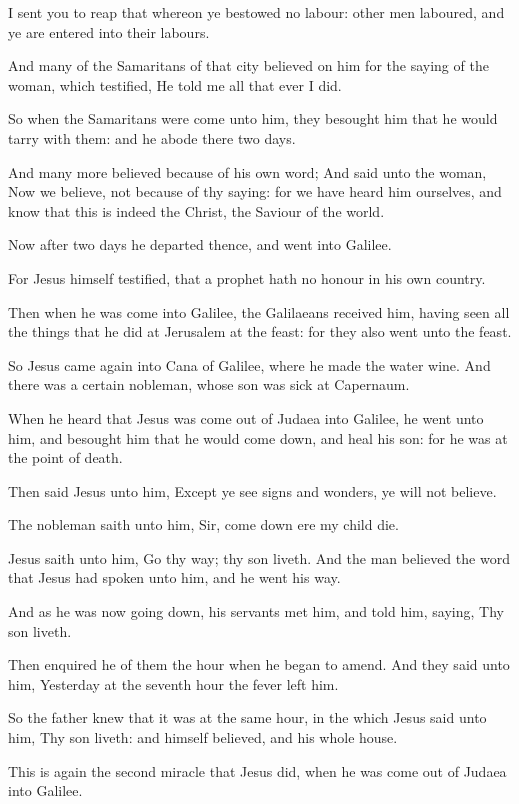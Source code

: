 \Verse I sent you to reap that whereon ye bestowed no labour: other men laboured, and ye are entered into their labours.

\Verse And many of the Samaritans of that city believed on him for the saying of the woman, which testified, He told me all that ever I did.

\Verse So when the Samaritans were come unto him, they besought him that he would tarry with them: and he abode there two days.

\Verse And many more believed because of his own word; \Verse And said unto the woman, Now we believe, not because of thy saying: for we have heard him ourselves, and know that this is indeed the Christ, the Saviour of the world.

\Verse Now after two days he departed thence, and went into Galilee.

\Verse For Jesus himself testified, that a prophet hath no honour in his own country.

\Verse Then when he was come into Galilee, the Galilaeans received him, having seen all the things that he did at Jerusalem at the feast: for they also went unto the feast.

\Verse So Jesus came again into Cana of Galilee, where he made the water wine. And there was a certain nobleman, whose son was sick at Capernaum.

\Verse When he heard that Jesus was come out of Judaea into Galilee, he went unto him, and besought him that he would come down, and heal his son: for he was at the point of death.

\Verse Then said Jesus unto him, Except ye see signs and wonders, ye will not believe.

\Verse The nobleman saith unto him, Sir, come down ere my child die.

\Verse Jesus saith unto him, Go thy way; thy son liveth. And the man believed the word that Jesus had spoken unto him, and he went his way.

\Verse And as he was now going down, his servants met him, and told him, saying, Thy son liveth.

\Verse Then enquired he of them the hour when he began to amend. And they said unto him, Yesterday at the seventh hour the fever left him.

\Verse So the father knew that it was at the same hour, in the which Jesus said unto him, Thy son liveth: and himself believed, and his whole house.

\Verse This is again the second miracle that Jesus did, when he was come out of Judaea into Galilee.


